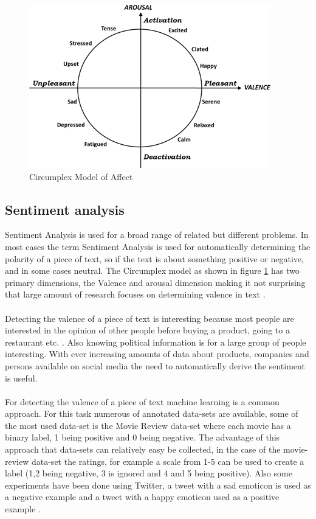 \documentclass[
10pt, %
a4paper, %
oneside, %
headinclude,footinclude, %
BCOR5mm, %
]{scrartcl}
\begin{document}
\begin{figure}[ht]
  \includegraphics[width=\linewidth]{5425219.jpg}
  \caption{Circumplex Model of Affect}
  \label{fig:circumplex}
\end{figure}



\subsection{Sentiment analysis}
Sentiment Analysis is used for a broad range of related but different problems. In most cases the term Sentiment Analysis is used for automatically determining the polarity of a piece of text, so if the text is about something positive or negative, and in some cases neutral. The Circumplex model as shown in figure \ref{fig:circumplex} has two primary dimensions, the Valence and arousal dimension making it not surprising that large amount of research focuses on determining valence in text \citep{pang2005seeing}.\\\\
Detecting the valence of a piece of text is interesting because most people are interested in the opinion of other people before buying a product, going to a restaurant etc. \citep{pang2008opinion}. Also knowing political information is for a large group of people interesting. With ever increasing amounts of data about products, companies and persons available on social media the need to automatically derive the sentiment is useful.\\\\
For detecting the valence of a piece of text machine learning is a common approach. For this task numerous of annotated data-sets are available, some of the most used data-set is the Movie Review data-set \citep{pang2002thumbs} where each movie has a binary label, 1 being positive and 0 being negative. The advantage of this approach that data-sets can relatively easy be collected, in the case of the movie-review data-set the ratings, for example a scale from 1-5 can be used to create a label (1,2 being negative, 3 is ignored and 4 and 5 being positive). Also some experiments have been done using Twitter, a tweet with a sad emoticon is used as a negative example and a tweet with a happy emoticon used as a positive example \citep{mohammad2015using}.
\end{document}
